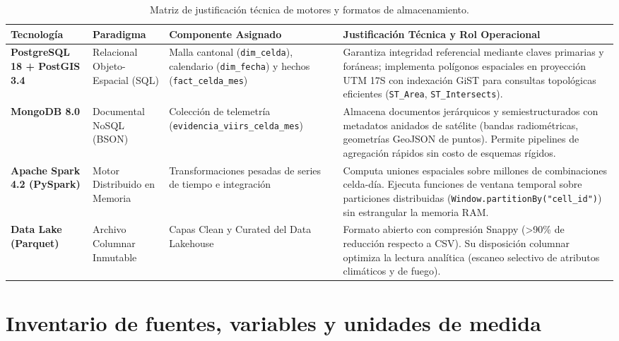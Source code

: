 \documentclass[11pt,a4paper]{article}
\begin{document}
\begin{table}[H]
\centering
\small
\caption{Matriz de justificaci\'on t\'ecnica de motores y formatos de almacenamiento.}
\label{tab:justificacion_tecnologica}
\begin{tabularx}{\textwidth}{@{}p{3.2cm}p{2.3cm}p{3.3cm}X@{}}
\toprule
\textbf{Tecnolog\'ia} & \textbf{Paradigma} & \textbf{Componente Asignado} & \textbf{Justificaci\'on T\'ecnica y Rol Operacional} \\
\midrule
\textbf{PostgreSQL 18 + PostGIS 3.4} & Relacional Objeto-Espacial (SQL) & Malla cantonal (\texttt{dim\_celda}), calendario (\texttt{dim\_fecha}) y hechos (\texttt{fact\_celda\_mes}) & Garantiza integridad referencial mediante claves primarias y for\'aneas; implementa pol\'igonos espaciales en proyecci\'on UTM 17S con indexaci\'on GiST para consultas topol\'ogicas eficientes (\texttt{ST\_Area}, \texttt{ST\_Intersects}). \\
\addlinespace
\textbf{MongoDB 8.0} & Documental NoSQL (BSON) & Colecci\'on de telemetr\'ia (\texttt{evidencia\_viirs\_celda\_mes}) & Almacena documentos jer\'arquicos y semiestructurados con metadatos anidados de sat\'elite (bandas radiom\'etricas, geometr\'ias GeoJSON de puntos). Permite pipelines de agregaci\'on r\'apidos sin costo de esquemas r\'igidos. \\
\addlinespace
\textbf{Apache Spark 4.2 (PySpark)} & Motor Distribuido en Memoria & Transformaciones pesadas de series de tiempo e integraci\'on & Computa uniones espaciales sobre millones de combinaciones celda-d\'ia. Ejecuta funciones de ventana temporal sobre particiones distribuidas (\texttt{Window.partitionBy("cell\_id")}) sin estrangular la memoria RAM. \\
\addlinespace
\textbf{Data Lake (Parquet)} & Archivo Columnar Inmutable & Capas Clean y Curated del Data Lakehouse & Formato abierto con compresi\'on Snappy (>90\% de reducci\'on respecto a CSV). Su disposici\'on columnar optimiza la lectura anal\'itica (escaneo selectivo de atributos clim\'aticos y de fuego). \\
\bottomrule
\end{tabularx}
\end{table}

\section{Inventario de fuentes, variables y unidades de medida}
\end{document}
